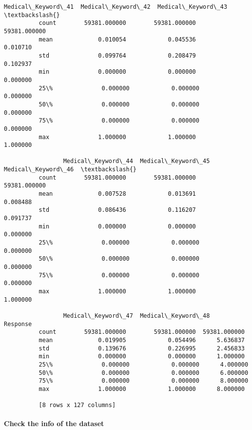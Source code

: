 \documentclass[11pt]{article}
\begin{document}
\begin{Verbatim}[commandchars=\\\{\}]
                 Medical\_Keyword\_41  Medical\_Keyword\_42  Medical\_Keyword\_43  \textbackslash{}
          count        59381.000000        59381.000000        59381.000000   
          mean             0.010054            0.045536            0.010710   
          std              0.099764            0.208479            0.102937   
          min              0.000000            0.000000            0.000000   
          25\%              0.000000            0.000000            0.000000   
          50\%              0.000000            0.000000            0.000000   
          75\%              0.000000            0.000000            0.000000   
          max              1.000000            1.000000            1.000000   
          
                 Medical\_Keyword\_44  Medical\_Keyword\_45  Medical\_Keyword\_46  \textbackslash{}
          count        59381.000000        59381.000000        59381.000000   
          mean             0.007528            0.013691            0.008488   
          std              0.086436            0.116207            0.091737   
          min              0.000000            0.000000            0.000000   
          25\%              0.000000            0.000000            0.000000   
          50\%              0.000000            0.000000            0.000000   
          75\%              0.000000            0.000000            0.000000   
          max              1.000000            1.000000            1.000000   
          
                 Medical\_Keyword\_47  Medical\_Keyword\_48      Response  
          count        59381.000000        59381.000000  59381.000000  
          mean             0.019905            0.054496      5.636837  
          std              0.139676            0.226995      2.456833  
          min              0.000000            0.000000      1.000000  
          25\%              0.000000            0.000000      4.000000  
          50\%              0.000000            0.000000      6.000000  
          75\%              0.000000            0.000000      8.000000  
          max              1.000000            1.000000      8.000000  
          
          [8 rows x 127 columns]
\end{Verbatim}
            
    \paragraph{Check the info of the
dataset}\label{check-the-info-of-the-dataset}
\end{document}
